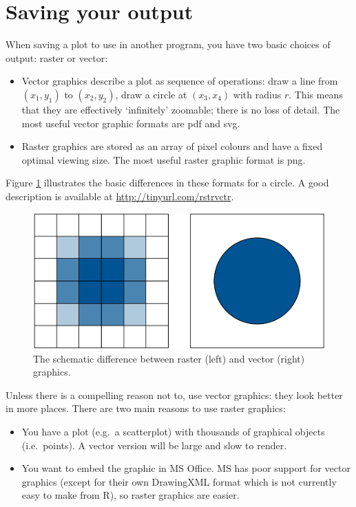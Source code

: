 \hypertarget{sec:saving}{\section{Saving your output}\label{sec:saving}}

When saving a plot to use in another program, you have two basic choices
of output: raster or vector:  

\begin{itemize}
\item
  Vector graphics describe a plot as sequence of operations: draw a line
  from \((x_1, y_1)\) to \((x_2, y_2)\), draw a circle at \((x_3, x_4)\)
  with radius \(r\). This means that they are effectively `infinitely'
  zoomable; there is no loss of detail. The most useful vector graphic
  formats are pdf and svg.
\item
  Raster graphics are stored as an array of pixel colours and have a
  fixed optimal viewing size. The most useful raster graphic format is
  png.
\end{itemize}

Figure \ref{fig:vector-raster} illustrates the basic differences in
these formats for a circle. A good description is available at
\url{http://tinyurl.com/rstrvctr}.

\begin{figure}[htbp]
  \centering
    \includegraphics[width= 0.5\linewidth]{diagrams/vector-raster}
  \caption{The schematic difference between raster (left) and vector (right) graphics. }
  \label{fig:vector-raster}
\end{figure}

Unless there is a compelling reason not to, use vector graphics: they
look better in more places. There are two main reasons to use raster
graphics:

\begin{itemize}
\item
  You have a plot (e.g.~a scatterplot) with thousands of graphical
  objects (i.e.~points). A vector version will be large and slow to
  render.
\item
  You want to embed the graphic in MS Office. MS has poor support for
  vector graphics (except for their own DrawingXML format which is not
  currently easy to make from R), so raster graphics are easier.
\end{itemize}

